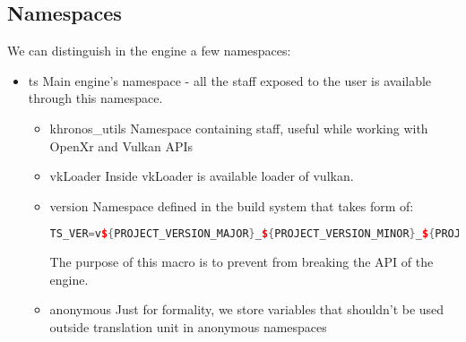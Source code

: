 \subsection{Namespaces}
We can distinguish in the engine a few namespaces:
\begin{itemize}
    \item ts
        Main engine's namespace - all the staff exposed to the user is available through this namespace.
    \begin{itemize}
        \item khronos\_utils
            Namespace containing staff, useful while working with OpenXr and Vulkan APIs
        \item vkLoader
            Inside vkLoader is available loader of vulkan.
        \item version
            Namespace defined in the build system that takes form of:
            \begin{lstlisting}[language=c++, caption= Definition of TS\_VER preprocessor macro (.engine/CMakeLists.txt)]
TS_VER=v${PROJECT_VERSION_MAJOR}_${PROJECT_VERSION_MINOR}_${PROJECT_VERSION_PATCH}
            \end{lstlisting}
            The purpose of this macro is to prevent from breaking the API of the engine.
        \item anonymous
            Just for formality, we store variables that shouldn't be used outside translation unit in anonymous namespaces
    \end{itemize}
\end{itemize}